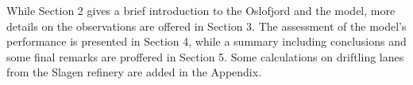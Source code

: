 While Section 2 gives a brief introduction to the Oslofjord and the model, more details on the observations are offered in Section 3. The assessment of the model's performance is presented in Section 4, while a summary including conclusions and some final remarks are proffered in Section 5. Some calculations on driftling lanes from the Slagen refinery are added in the Appendix.







\newpage
